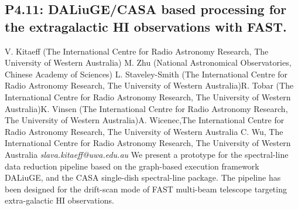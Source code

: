 \documentclass{report}
\begin{document}
\subsection*{P4.11: DALiuGE/CASA based processing for the extragalactic HI observations with FAST.}
\bigskip
V. Kitaeff (The International Centre for Radio Astronomy Research, The University of Western Australia) \newline M. Zhu (National Astronomical Observatories, Chinese Academy of Sciences) \newline  L. Staveley-Smith (The International Centre for Radio Astronomy Research, The University of Western Australia)\newline  R. Tobar (The International Centre for Radio Astronomy Research, The University of Western Australia)\newline K. Vinsen (The International Centre for Radio Astronomy Research, The University of Western Australia)\newline  A. Wicenec,The International Centre for Radio Astronomy Research, The University of Western Australia
C. Wu, The International Centre for Radio Astronomy Research, The University of Western Australia\newline\newline
{\it slava.kitaeff@uwa.edu.au}\newline
\newline\newline
We present a prototype for the spectral-line data reduction pipeline based on  the graph-based execution framework DALiuGE, and the CASA single-dish spectral-line package. The pipeline has been designed for the drift-scan mode of FAST multi-beam telescope targeting extra-galactic HI observations.\newline
\newpage
\end{document}
